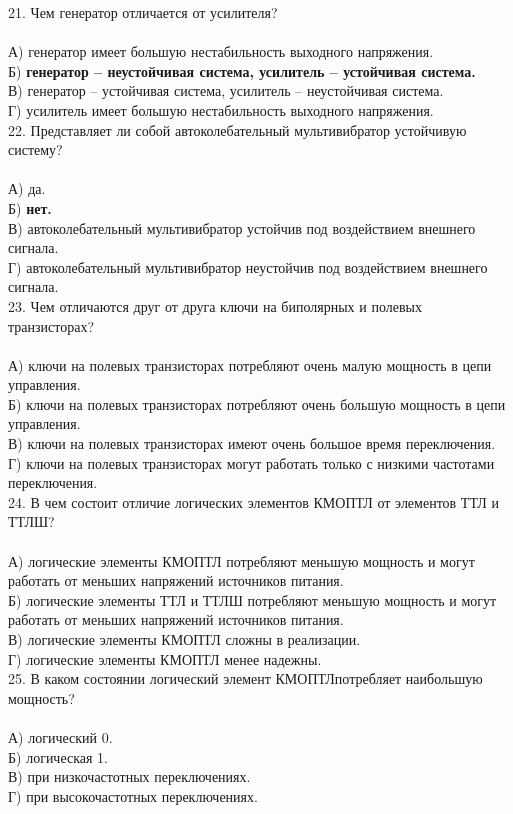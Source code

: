 21. Чем генератор отличается от усилителя?\\\\
А) генератор имеет большую нестабильность выходного напряжения.\\
Б) \textbf{генератор – неустойчивая система, усилитель – устойчивая система.}\\
В) генератор – устойчивая система, усилитель – неустойчивая система.\\
Г) усилитель имеет большую нестабильность выходного напряжения.\\

22. Представляет ли собой автоколебательный мультивибратор устойчивую систему?\\\\
А) да.\\
Б) \textbf{нет.}\\
В) автоколебательный мультивибратор устойчив под воздействием внешнего сигнала.\\
Г) автоколебательный мультивибратор неустойчив под воздействием внешнего сигнала.\\

23. Чем отличаются друг от друга ключи на биполярных и полевых транзисторах?\\\\
А) ключи на полевых транзисторах потребляют очень малую мощность в цепи управления.\\
Б) ключи на полевых транзисторах потребляют очень большую мощность в цепи управления.\\
В) ключи на полевых транзисторах имеют очень большое время переключения.\\
Г) ключи на полевых транзисторах могут работать только с низкими частотами переключения.\\

24. В чем состоит отличие логических элементов КМОПТЛ от элементов ТТЛ и ТТЛШ?\\\\
А) логические элементы КМОПТЛ потребляют меньшую мощность и могут работать от меньших напряжений источников питания.\\
Б) логические элементы ТТЛ и ТТЛШ потребляют меньшую мощность и могут работать от меньших напряжений источников питания.\\
В) логические элементы КМОПТЛ сложны в реализации.\\
Г) логические элементы КМОПТЛ менее надежны.\\

25. В каком состоянии логический элемент КМОПТЛпотребляет наибольшую мощность?\\\\
А) логический 0.\\
Б) логическая 1.\\
В) при низкочастотных переключениях.\\
Г) при высокочастотных переключениях.\\

